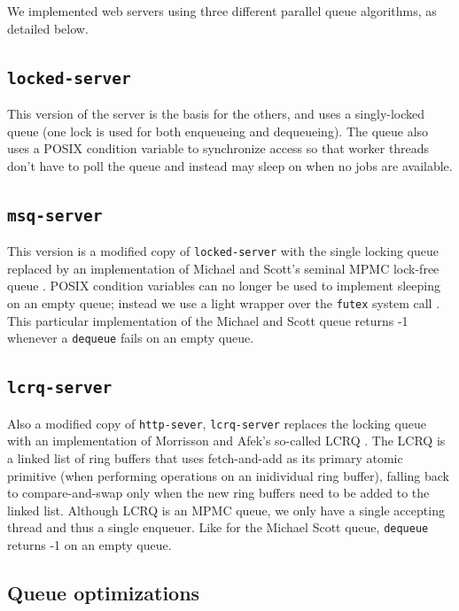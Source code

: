 \documentclass[twoside,10pt]{article}
\begin{document}
\begin{multicols}{2}
We implemented web servers using three different parallel queue
algorithms, as detailed below.

\subsection{\texttt{locked-server}}

This version of the server is the basis for the others, and uses a
singly-locked queue (one lock is used for both enqueueing and
dequeueing). The queue also uses a POSIX condition variable to synchronize
access so that worker threads don't have to poll the queue and instead may
sleep on when no jobs are available.

\subsection{\texttt{msq-server}}

This version is a modified copy of \verb+locked-server+ with the single
locking queue replaced by an implementation of Michael and Scott's
seminal MPMC lock-free queue \cite{synch-1.0.1}. POSIX
condition variables can no longer be used to implement sleeping on an
empty queue; instead we use a light wrapper over the \verb+futex+ system
call \cite{drepper2005futexes}. This particular implementation of the Michael and Scott queue
returns -1 whenever a \verb+dequeue+ fails on an empty queue. 

\subsection{\texttt{lcrq-server}}

Also a modified copy of \verb+http-sever+, \verb+lcrq-server+ replaces
the locking queue with an implementation of Morrisson and Afek's
so-called LCRQ \cite{lcrq-source}. The LCRQ is a linked list of ring buffers that uses
fetch-and-add as its primary atomic primitive (when performing
operations on an inidividual ring buffer), falling back to
compare-and-swap only when the new ring buffers need to be added to
the linked list. Although LCRQ is an MPMC queue, we only have a single
accepting thread and thus a single enqueuer. Like for the Michael
Scott queue, \verb+dequeue+ returns -1 on an empty queue. 

\subsection{Queue optimizations}


\end{multicols}
\end{document}
